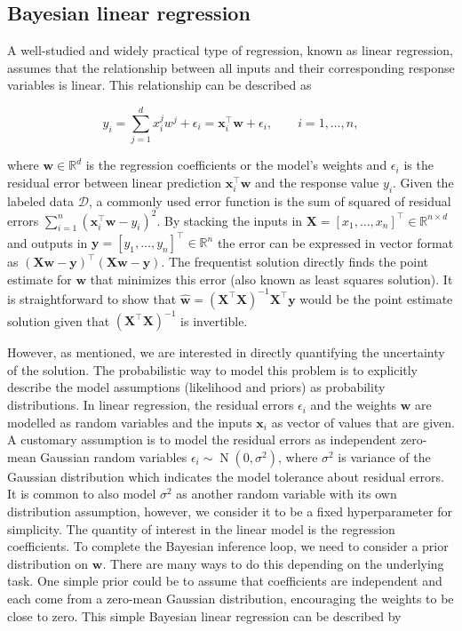 \documentclass[dissertation,math,vertlayout,pdfa,colorlinks]{aaltoseries}
\newcommand{\bw}{\bm{w}}
\newcommand{\bX}{\bm{X}}
\newcommand{\by}{\bm{y}}
\newcommand{\bD}{\mathcal{D}}
\DeclareMathOperator{\normalpdf}{N}
\newcommand{\tp}{^{\top}}
\begin{document}
\subsection{Bayesian linear regression}

A well-studied and widely practical type of regression, known as linear regression, assumes that the relationship between all inputs and their corresponding response variables is linear. This relationship can be described as 

\begin{equation*}
y_i= \sum_{j=1}^{d}x_{i}^{j} w^{j}+\epsilon_i=\bm{x}_i\tp\bw+\epsilon_i, \qquad i=1,\ldots,n, 
\end{equation*}

\noindent where $\bw \in \mathbb{R}^d$ is the regression coefficients or the model's weights and $\epsilon_i$ is the residual error between linear prediction $\bm{x}_i\tp\bw$ and the response value $y_i$. Given the labeled data $\bD$, a commonly used error function is the sum of squared of residual errors $\sum_{i=1}^n(\bm{x}_i\tp\bw- y_i)^2$. By stacking the inputs in $\bX = [x_1,\ldots,x_n]\tp \in \mathbb{R}^{n\times d}$ and outputs in $\by = [y_1,\ldots,y_n]\tp \in \mathbb{R}^n$ the error can be expressed in vector format as $(\bX\bw- \by)\tp(\bX\bw- \by)$. The frequentist solution directly finds the point estimate for $\bw$ that minimizes this error (also known as least squares solution). It is straightforward to show that $\hat{\bw} = (\bX \tp \bX)^{-1}\bX\tp \by$  would be the point estimate solution given that $(\bX \tp \bX)^{-1}$ is invertible.  

However, as mentioned, we are interested in directly quantifying the uncertainty of the solution. The probabilistic way to model this problem is to explicitly describe the model assumptions (likelihood and priors) as probability distributions. In linear regression, the residual errors $\epsilon_i$ and the weights $\bw$ are modelled as random variables and the inputs $\bm{x}_i$ as vector of values that are given. A customary assumption is to model the residual errors as independent zero-mean Gaussian random variables $\epsilon_i \sim \normalpdf(0,\sigma^2)$, where $\sigma^2$ is variance of the Gaussian distribution which indicates the model tolerance about residual errors. It is common to also model $\sigma^2$ as another random variable with its own distribution assumption, however, we consider it to be a fixed hyperparameter for simplicity. The quantity of interest in the linear model is the regression coefficients. To complete the Bayesian inference loop, we need to consider a prior distribution on $\bw$. There are many ways to do this depending on the underlying task. One simple prior could be to assume that coefficients are independent and each come from a zero-mean Gaussian distribution, encouraging the weights to be close to zero. This simple Bayesian linear regression can be described by
\end{document}
